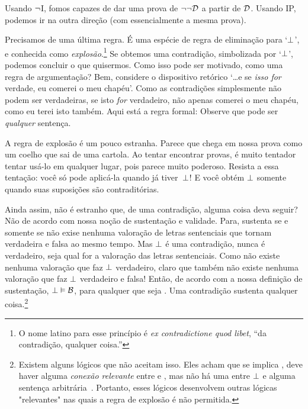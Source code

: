 Usando $\neg$I, fomos capazes de dar uma prova de $\neg\neg\mathcal{D}$ a partir de $\mathcal{D}$. Usando IP, podemos ir na outra dire\c c\~ao (com essencialmente a mesma prova).
	\begin{fitchproof}
		\open
		\close
	\end{fitchproof}

Precisamos de uma \'ultima regra. \'E uma esp\'ecie de regra de elimina\c c\~ao para `$\bot$', e conhecida como \emph{explos\~ao}.\footnote{O nome latino para esse princ\'ipio \'e  \emph{ex contradictione quod libet}, ``da contradi\c c\~ao, qualquer coisa.''}  Se obtemos uma contradi\c c\~ao, simbolizada por `$\bot$', podemos concluir o que quisermos.  Como isso pode ser motivado, como uma regra de argumenta\c c\~ao? Bem, considere o dispositivo ret\'orico `\ldots e se \emph{isso for} verdade, eu comerei o meu chap\'eu'. Como as contradi\c c\~oes simplesmente n\~ao podem ser verdadeiras, se isto \emph{for} verdadeiro, n\~ao apenas comerei o meu chap\'eu, como eu terei isto tamb\'em. Aqui est\'a a regra formal:
Observe que   pode ser \emph{qualquer} senten\c ca.

A regra de explos\~ao \'e um pouco estranha. Parece que    chega em nossa prova como um coelho que sai de uma cartola. Ao tentar encontrar provas, \'e muito tentador tentar us\'a-lo em qualquer lugar, pois parece muito poderoso. Resista a essa tenta\c c\~ao: voc\^e s\'o pode aplic\'a-la quando j\'a tiver~$\bot$!   E voc\^e obt\'em $\bot$   somente quando suas suposi\c c\~oes s\~ao contradit\'orias.
 

Ainda assim, n\~ao \'e estranho que, de uma contradi\c c\~ao, alguma coisa deva seguir? N\~ao de acordo com nossa no\c c\~ao de sustenta\c c\~ao e validade. Para,  sustenta  se e somente se  n\~ao exise nenhuma valora\c c\~ao de letras sentenciais que  tornam  verdadeira e  falsa ao mesmo tempo. Mas $\bot$  \'e uma contradi\c c\~ao, nunca \'e verdadeiro, seja qual for a valora\c c\~ao das letras sentenciais.  Como n\~ao existe nenhuma valora\c c\~ao que faz $\bot$ verdadeiro, claro que tamb\'em n\~ao existe nenhuma valora\c c\~ao que faz  $\bot$  verdadeiro e  falsa! Ent\~ao, de acordo com a nossa defini\c c\~ao de sustenta\c c\~ao,  $\bot \vDash \mathcal{B}$,  para qualquer que seja . Uma contradi\c c\~ao sustenta qualquer coisa.\footnote{Existem alguns l\'ogicos que n\~ao aceitam isso. Eles acham que se  implica , deve haver alguma \emph{conex\~ao relevante} entre  e , mas n\~ao h\'a uma entre $\bot$ e alguma senten\c ca arbitr\'aria~. Portanto, esses l\'ogicos desenvolvem outras l\'ogicas "relevantes" nas quais  a regra de explos\~ao \'e n\~ao permitida.}

